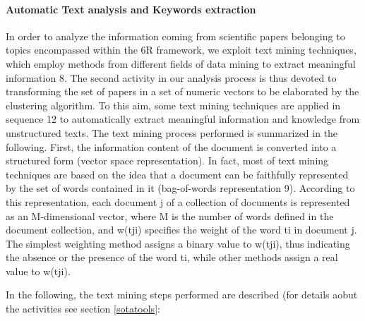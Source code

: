 \documentclass[]{book}
\let\oldparagraph\paragraph
\renewcommand{\paragraph}[1]{\oldparagraph{#1}\mbox{}}
\begin{document}
\paragraph{Automatic Text analysis and Keywords
extraction}\label{automatic-text-analysis-and-keywords-extraction}

In order to analyze the information coming from scientific papers
belonging to topics encompassed within the 6R framework, we exploit text
mining techniques, which employ methods from different fields of data
mining to extract meaningful information 8. The second activity in our
analysis process is thus devoted to transforming the set of papers in a
set of numeric vectors to be elaborated by the clustering algorithm. To
this aim, some text mining techniques are applied in sequence 12 to
automatically extract meaningful information and knowledge from
unstructured texts. The text mining process performed is summarized in
the following. First, the information content of the document is
converted into a structured form (vector space representation). In fact,
most of text mining techniques are based on the idea that a document can
be faithfully represented by the set of words contained in it
(bag-of-words representation 9). According to this representation, each
document j of a collection of documents is represented as an
M-dimensional vector, where M is the number of words defined in the
document collection, and w(tji) specifies the weight of the word ti in
document j. The simplest weighting method assigns a binary value to
w(tji), thus indicating the absence or the presence of the word ti,
while other methods assign a real value to w(tji).

In the following, the text mining steps performed are described (for
details aobut the activities see section \ref{sotatools}:
\end{document}
